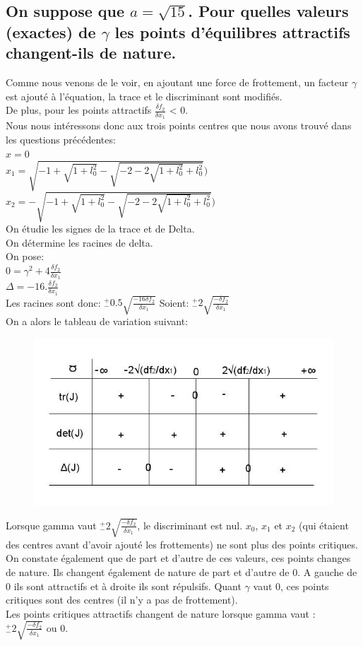 \documentclass[10pt,a4paper]{article}
\begin{document}
\subsection{On suppose que $a=\sqrt{15}$. Pour quelles valeurs (exactes) de $\gamma$ les points d'équilibres attractifs changent-ils de nature.}

Comme nous venons de le voir, en ajoutant une force de frottement, un facteur $\gamma$ est ajouté à l'équation, la trace et le discriminant sont modifiés. \\
De plus, pour les points attractifs $\frac{\delta f_2}{\delta x_1}$ < 0.\\
Nous nous intéressons donc aux trois points centres que nous avons trouvé dans les questions précédentes:\\
$x=0$\\
$x_1=\sqrt{-1+\sqrt{1+l_0^2}-\sqrt{-2-2\sqrt{1+l_0^2}+l_0^2}})$\\
$x_2=-\sqrt{-1+\sqrt{1+l_0^2}-\sqrt{-2-2\sqrt{1+l_0^2}+l_0^2}})$
\\
On étudie les signes de la trace et de Delta.\\
On détermine les racines de delta.\\
On pose:\\
$0 = \gamma^2 + 4\frac{\delta f_2}{\delta x_1}$ 
\\
$\Delta=-16.\frac{\delta f_2}{\delta x_1}$ 
\\
Les racines sont donc: $ ^+_-0.5\sqrt{\frac{-16\delta f_2}{\delta x_1}} $   Soient: $ ^+_-2\sqrt{\frac{-\delta f_2}{\delta x_1}} $  \\
On a alors le tableau de variation suivant:\\
\begin{figure}[H]
	\includegraphics[scale=0.5]{tab_var_gamma.jpg}
\end{figure} 
Lorsque gamma vaut $ ^+_-2\sqrt{\frac{-\delta f_2}{\delta x_1}} $, le discriminant est nul. $x_0$, $x_1$ et $x_2$ (qui étaient des centres avant d’avoir ajouté les frottements) ne sont plus des points critiques. On constate également que de part et d’autre de ces valeurs, ces points changes de nature. Ils changent également de nature de part et d’autre de 0. A gauche de 0 ils sont attractifs et à droite ils sont répulsifs. Quant $\gamma$ vaut 0, ces points critiques sont des centres (il n’y a pas de frottement).
\\
Les points critiques attractifs changent de nature lorsque gamma vaut :\\
$ ^+_-2\sqrt{\frac{-\delta f_2}{\delta x_1}} $ ou 0. 
\end{document}
